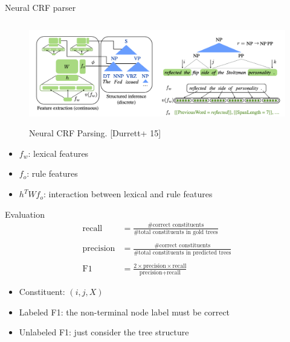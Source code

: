 \documentclass[usenames,dvipsnames,notes,11pt,aspectratio=169]{beamer}
\begin{document}
\begin{frame}
    {Neural CRF parser}
    \begin{figure}
        \includegraphics[height=4.5cm]{figures/neural-crf}
        \caption{Neural CRF Parsing. [Durrett+ 15]}
    \end{figure}
    \begin{itemize}
        \item $f_w$: lexical features
        \item $f_o$: rule features
        \item $h^TWf_o$: interaction between lexical and rule features
    \end{itemize}
\end{frame}

\begin{frame}
    {Evaluation}
    \begin{align*}
        \text{recall} &= \frac{\# \text{correct constituents}}{\# \text{total constituents in gold trees}}\\\\
        \text{precision} &= \frac{\# \text{correct constituents}}{\# \text{total constituents in predicted trees}} \\\\
        \text{F1} &= \frac{2\times\text{precision}\times\text{recall}}{\text{precision}+\text{recall}}
    \end{align*}
    \begin{itemize}
        \item Constituent: $(i, j, X)$
        \item Labeled F1: the non-terminal node label must be correct
        \item Unlabeled F1: just consider the tree structure
    \end{itemize}
\end{frame}
\end{document}
